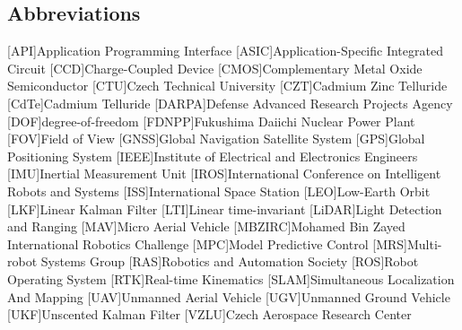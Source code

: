 \documentclass[a4paper,11pt,twoside,openright]{book}
\newcommand{\conditionalClearPage}{
  \ifdefined\printversion
    \cleardoublepage
  \else
    \clearpage
  \fi
}
\begin{document}


\pagestyle{plain}

\conditionalClearPage



\conditionalClearPage


\conditionalClearPage


\conditionalClearPage


\conditionalClearPage

\begin{changemargin}{0.8cm}{0.8cm}
\section*{Abbreviations}
\begin{acronym}[MBZIRC]
  [API]{Application Programming Interface}
  [ASIC]{Application-Specific Integrated Circuit}
  [CCD]{Charge-Coupled Device}
  [CMOS]{Complementary Metal Oxide Semiconductor}
  [CTU]{Czech Technical University}
  [CZT]{Cadmium Zinc Telluride}
  [CdTe]{Cadmium Telluride}
  [DARPA]{Defense Advanced Research Projects Agency}
  [DOF]{degree-of-freedom}
  [FDNPP]{Fukushima Daiichi Nuclear Power Plant}
  [FOV]{Field of View}
  [GNSS]{Global Navigation Satellite System}
  [GPS]{Global Positioning System}
  [IEEE]{Institute of Electrical and Electronics Engineers}
  [IMU]{Inertial Measurement Unit}
  [IROS]{International Conference on Intelligent Robots and Systems}
  [ISS]{International Space Station}
  [LEO]{Low-Earth Orbit}
  [LKF]{Linear Kalman Filter}
  [LTI]{Linear time-invariant}
  [LiDAR]{Light Detection and Ranging}
  [MAV]{Micro Aerial Vehicle}
  [MBZIRC]{Mohamed Bin Zayed International Robotics Challenge}
  [MPC]{Model Predictive Control}
  [MRS]{Multi-robot Systems Group}
  [RAS]{Robotics and Automation Society}
  [ROS]{Robot Operating System}
  [RTK]{Real-time Kinematics}
  [SLAM]{Simultaneous Localization And Mapping}
  [UAV]{Unmanned Aerial Vehicle}
  [UGV]{Unmanned Ground Vehicle}
  [UKF]{Unscented Kalman Filter}
  [VZLU]{Czech Aerospace Research Center}
\end{acronym}
\end{changemargin}
\end{document}
